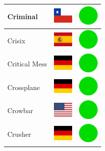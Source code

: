 \documentclass[12pt, a4paper, twoside]{report}
\begin{document}
\begin{center}
\begin{longtable}{|p{5cm}|p{2cm}|p{2cm}|}
 Criminal                                                   & \includegraphics[width=1cm]{4x3/cl} &   \includegraphics[width=1cm]{likes/y} \\ \hline
 Crisix                                                     & \includegraphics[width=1cm]{4x3/es} &   \includegraphics[width=1cm]{likes/y} \\ \hline
 Critical Mess                                              & \includegraphics[width=1cm]{4x3/de} &   \includegraphics[width=1cm]{likes/y} \\ \hline
 Crossplane                                                 & \includegraphics[width=1cm]{4x3/de} &   \includegraphics[width=1cm]{likes/y} \\ \hline
 Crowbar                                                    & \includegraphics[width=1cm]{4x3/us} &   \includegraphics[width=1cm]{likes/y} \\ \hline
 Crusher                                                    & \includegraphics[width=1cm]{4x3/de} &   \includegraphics[width=1cm]{likes/y} \\ \hline

\end{longtable}
\end{center}
\end{document}
